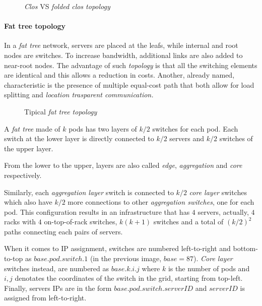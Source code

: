 \begin{figure}[ht!]
    \centering
    \hspace{1.5cm}
    \caption{\emph{Clos} VS \emph{folded clos topology}}
\end{figure}

\paragraph{Fat tree topology}
In a \emph{fat tree} network, servers are placed at the leafs, while internal
and root nodes are switches. To increase bandwidth, additional links are also
added to near-root nodes. The advantage of such \emph{topology} is that all the
switching elements are identical and this allows a reduction in costs. Another,
already named, characteristic is the presence of multiple equal-cost path that
both allow for load splitting and \emph{location trasparent communication.}

\begin{figure}[h!]
    \centering
    \caption{Tipical \emph{fat tree topology}}
\end{figure}

\noindent
A \emph{fat tree} made of $k$ pods has two layers of $k/2$ switches for each
pod. Each switch at the lower layer is directly connected to $k/2$ servers
and $k/2$ switches of the upper layer.

\begin{note}
    From the lower to the upper, layers are also called \emph{edge},
    \emph{aggregation} and \emph{core} respectively.
\end{note}

\noindent
Similarly, each \emph{aggregation layer} switch is connected to $k/2$ \emph{core
layer} switches which also have $k/2$ more connections to other \emph{aggregation
switches}, one for each pod. This configuration results in an infrastructure
that has $4$ servers, actually, $4$ racks with $4$ on-top-of-rack switches,
$k(k+1)$ switches and a total of $(k/2)^2$ paths connecting each pairs of
servers.

When it comes to IP assignment, switches are numbered left-to-right and
bottom-to-top as $base.pod.switch.1$ (in the previous image, $base=87$).
\emph{Core layer} switches instead, are numbered as $base.k.i.j$ where $k$ is
the number of pods and $i,j$ denotates the coordinates of the switch in the
grid, starting from top-left. Finally, servers IPs are in the form
$base.pod.switch.serverID$ and $serverID$ is assigned from left-to-right.

